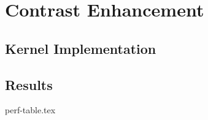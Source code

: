 \documentclass[final]{report}
\begin{document}
\chapter{Contrast Enhancement}

\section{Kernel Implementation}



\section{Results}
{perf-table.tex}
\end{document}
